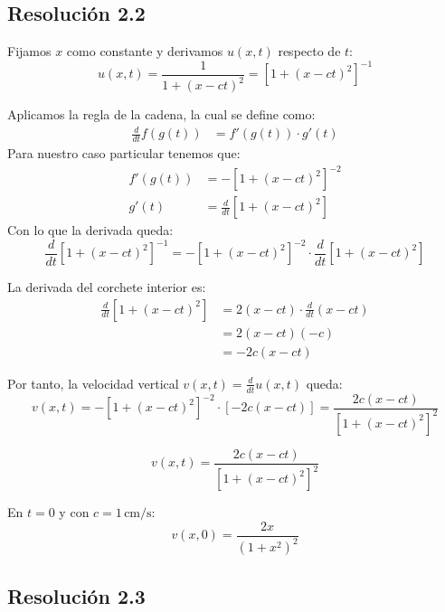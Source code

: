 \documentclass[
  11pt,
  letterpaper,
   addpoints,
   answers
  ]{exam}
\begin{document}
\begin{questions}
\begin{solution}
  \subsection*{Resolución 2.2}

Fijamos $x$ como constante y derivamos $u(x,t)$ respecto de $t$:
\begin{equation}
u(x,t) = \frac{1}{1+(x-ct)^2} = [1+(x-ct)^2]^{-1}
\end{equation}

Aplicamos la regla de la cadena, la cual se define como:
\begin{align}
\frac{d}{dt} f(g(t)) &= f'(g(t)) \cdot g'(t)
\end{align}
Para nuestro caso particular tenemos que:
\begin{align}
  f'(g(t)) &= -[1+(x-ct)^2]^{-2} \\
  g'(t) &= \frac{d}{dt}[1+(x-ct)^2]
\end{align}
Con lo que la derivada queda:
\begin{equation}
\frac{d}{dt} [1+(x-ct)^2]^{-1} = -[1+(x-ct)^2]^{-2} \cdot \frac{d}{dt}[1+(x-ct)^2]
\end{equation}

La derivada del corchete interior es:
\begin{align}
\frac{d}{dt}[1+(x-ct)^2] &= 2(x-ct) \cdot \frac{d}{dt}(x-ct) \\
&= 2(x-ct)(-c) \\
&= -2c(x-ct)
\end{align}

Por tanto, la velocidad vertical $v(x,t) = \frac{d}{dt}u(x,t)$ queda:
\begin{equation}
v(x,t) = -[1+(x-ct)^2]^{-2} \cdot [-2c(x-ct)] = \frac{2c(x-ct)}{[1+(x-ct)^2]^2}
\end{equation}

\begin{equation}
\boxed{v(x,t) = \frac{2c(x-ct)}{[1+(x-ct)^2]^2}}
\end{equation}

En $t=0$ y con $c=1\,\mathrm{cm/s}$:
\begin{equation}
\boxed{v(x,0) = \frac{2x}{(1+x^2)^2}}
\end{equation}




  \subsection*{Resolución 2.3}
  

\end{solution}
\end{questions}
\end{document}
